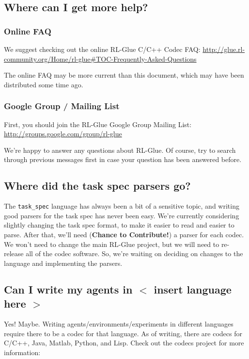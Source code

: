 \documentclass[11pt]{article}
\begin{document}
\subsection{Where can I get more help?}
\subsubsection{Online FAQ}
We suggest checking out the online RL-Glue C/C++ Codec FAQ:\newline
\url{http://glue.rl-community.org/Home/rl-glue#TOC-Frequently-Asked-Questions}

The online FAQ may be more current than this document, which may have been distributed some time ago.

\subsubsection{Google Group / Mailing List}
First, you should join the RL-Glue Google Group Mailing List:\newline
\url{http://groups.google.com/group/rl-glue}

We're happy to answer any questions about RL-Glue.  Of course, try to search through previous messages first in case your question has been answered before.

\subsection{Where did the task spec parsers go?}
The \texttt{task\_spec} language has always been a bit of a sensitive topic, and writing good parsers for the task spec has never been easy. We're currently considering slightly changing the task spec format, to make
it easier to read and easier to parse.  After that, we'll need (\textbf{Chance to Contribute!}) a parser for each codec.  We won't need to change the main RL-Glue project, but we will need to re-release all of the 
codec software.  So, we're waiting on deciding on changes to the language and implementing the parsers.

\subsection{Can I write my agents in $<$ insert language here $>$}
Yes! Maybe.  Writing agents/environments/experiments in different languages require there to be a codec for that language.  As of writing, there are codecs for C/C++, Java, Matlab, Python, and Lisp.  Check out the codecs project for more information:\newline
{}
\end{document}
